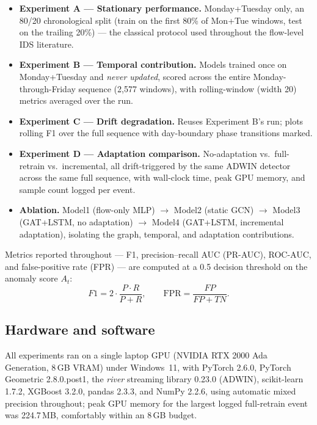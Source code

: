 \documentclass[twocolumn]{llncs}
\begin{document}
\begin{itemize}[nosep]
  \item \textbf{Experiment A --- Stationary performance.} Monday+Tuesday only, an 80/20
        chronological split (train on the first 80\% of Mon+Tue windows, test on the trailing
        20\%) --- the classical protocol used throughout the flow-level IDS literature.
  \item \textbf{Experiment B --- Temporal contribution.} Models trained once on Monday+Tuesday
        and \emph{never updated}, scored across the entire Monday-through-Friday sequence
        (2{,}577 windows), with rolling-window (width 20) metrics averaged over the run.
  \item \textbf{Experiment C --- Drift degradation.} Reuses Experiment B's run; plots rolling F1
        over the full sequence with day-boundary phase transitions marked.
  \item \textbf{Experiment D --- Adaptation comparison.} No-adaptation vs.\ full-retrain vs.\
        incremental, all drift-triggered by the same ADWIN detector across the same full
        sequence, with wall-clock time, peak GPU memory, and sample count logged per event.
  \item \textbf{Ablation.} Model1 (flow-only MLP) $\rightarrow$ Model2 (static GCN)
        $\rightarrow$ Model3 (GAT+LSTM, no adaptation) $\rightarrow$ Model4 (GAT+LSTM,
        incremental adaptation), isolating the graph, temporal, and adaptation contributions.
\end{itemize}

Metrics reported throughout --- F1, precision--recall AUC (PR-AUC), ROC-AUC, and false-positive
rate (FPR) --- are computed at a 0.5 decision threshold on the anomaly score $A_t$:
\begin{equation}
F1 = 2\cdot\frac{P\cdot R}{P+R}, \qquad
\mathrm{FPR} = \frac{FP}{FP+TN}.
\label{eq:metrics}
\end{equation}

\subsection{Hardware and software}
\label{sec:hw}
All experiments ran on a single laptop GPU (NVIDIA RTX 2000 Ada Generation, 8\,GB VRAM) under
Windows~11, with PyTorch 2.6.0, PyTorch Geometric 2.8.0.post1, the \emph{river} streaming library
0.23.0 (ADWIN), scikit-learn 1.7.2, XGBoost 3.2.0, pandas 2.3.3, and NumPy 2.2.6, using automatic
mixed precision throughout; peak GPU memory for the largest logged full-retrain event was
224.7\,MB, comfortably within an 8\,GB budget.
\end{document}
